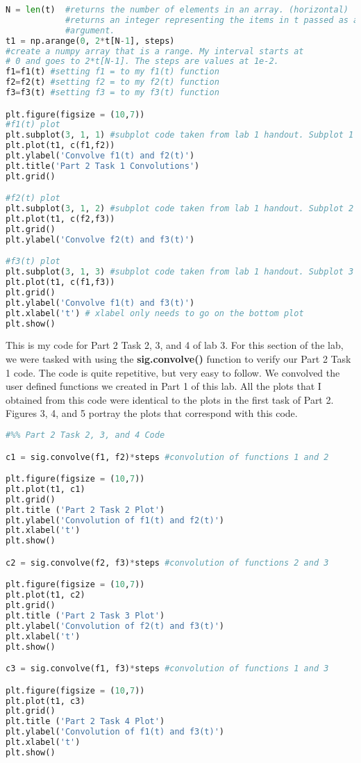 \documentclass[12pt]{report}
\begin{document}
\begin{lstlisting}[language=Python]
N = len(t)  #returns the number of elements in an array. (horizontal)
            #returns an integer representing the items in t passed as an
            #argument.
t1 = np.arange(0, 2*t[N-1], steps)
#create a numpy array that is a range. My interval starts at
# 0 and goes to 2*t[N-1]. The steps are values at 1e-2.    
f1=f1(t) #setting f1 = to my f1(t) function
f2=f2(t) #setting f2 = to my f2(t) function
f3=f3(t) #setting f3 = to my f3(t) function

plt.figure(figsize = (10,7))
#f1(t) plot
plt.subplot(3, 1, 1) #subplot code taken from lab 1 handout. Subplot 1
plt.plot(t1, c(f1,f2))
plt.ylabel('Convolve f1(t) and f2(t)')
plt.title('Part 2 Task 1 Convolutions')
plt.grid()

#f2(t) plot
plt.subplot(3, 1, 2) #subplot code taken from lab 1 handout. Subplot 2
plt.plot(t1, c(f2,f3))
plt.grid()
plt.ylabel('Convolve f2(t) and f3(t)')

#f3(t) plot
plt.subplot(3, 1, 3) #subplot code taken from lab 1 handout. Subplot 3
plt.plot(t1, c(f1,f3))
plt.grid()
plt.ylabel('Convolve f1(t) and f3(t)')
plt.xlabel('t') # xlabel only needs to go on the bottom plot
plt.show()
\end{lstlisting}

{This is my code for Part 2 Task 2, 3, and 4 of lab 3. For this section of the lab, we were tasked with using the \textbf{sig.convolve()} function to verify our Part 2 Task 1 code. The code is quite repetitive, but very easy to follow. We convolved the user defined functions we created in Part 1 of this lab. All the plots that I obtained from this code were identical to the plots in the first task of Part 2. Figures 3, 4, and 5 portray the plots that correspond with this code.}
\begin{lstlisting}[language=Python]
#%% Part 2 Task 2, 3, and 4 Code

c1 = sig.convolve(f1, f2)*steps #convolution of functions 1 and 2

plt.figure(figsize = (10,7))
plt.plot(t1, c1)
plt.grid()
plt.title ('Part 2 Task 2 Plot')
plt.ylabel('Convolution of f1(t) and f2(t)')
plt.xlabel('t')
plt.show()

c2 = sig.convolve(f2, f3)*steps #convolution of functions 2 and 3

plt.figure(figsize = (10,7))
plt.plot(t1, c2)
plt.grid()
plt.title ('Part 2 Task 3 Plot')
plt.ylabel('Convolution of f2(t) and f3(t)')
plt.xlabel('t')
plt.show()

c3 = sig.convolve(f1, f3)*steps #convolution of functions 1 and 3

plt.figure(figsize = (10,7))
plt.plot(t1, c3)
plt.grid()
plt.title ('Part 2 Task 4 Plot')
plt.ylabel('Convolution of f1(t) and f3(t)')
plt.xlabel('t')
plt.show()
\end{lstlisting}
\end{document}
